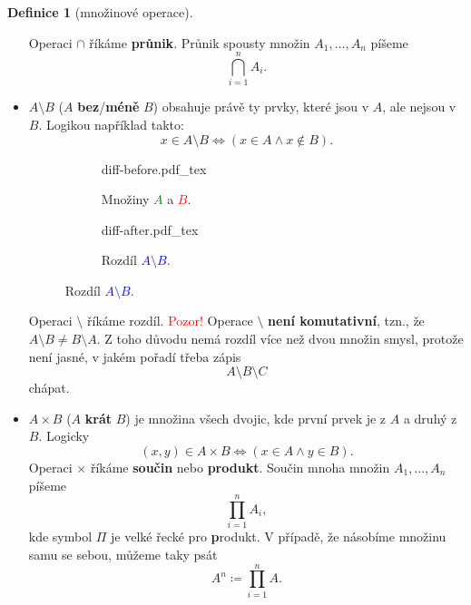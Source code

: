 \documentclass[a4paper,11pt]{article}
\theoremstyle{definition}
\newtheorem{dfn}[thm]{Definice}
\theoremstyle{plain}
\begin{document}
\begin{dfn}[množinové operace]
\begin{itemize}
\begin{center}
   \end{center}
   \vspace*{-8mm}
   Operaci $ \cap $ říkáme \textbf{průnik}. Průnik spousty množin
   $A_1,\ldots,A_n$ píšeme
   \[
    \bigcap_{i=1}^{n} A_i.
   \]
  \item $A \setminus B$ ($A$ \textbf{bez}/\textbf{méně} $B$) obsahuje právě ty
   prvky, které jsou v $A$, ale nejsou v $B$. Logikou například takto:
   \[
    x \in A \setminus B \Leftrightarrow (x \in A \wedge x \notin B).
   \]
   \begin{center}
    \begin{figure}[h]
     \centering
     \begin{subfigure}{0.45\textwidth}
      \centering
      \def\svgwidth{0.6\textwidth}
      {diff-before.pdf_tex}
      \caption*{Množiny \textcolor{green}{$A$} a \textcolor{red}{$B$}.}
     \end{subfigure}
     \begin{subfigure}{0.45\textwidth}
      \centering
      \def\svgwidth{0.6\textwidth}
      {diff-after.pdf_tex}
      \caption*{Rozdíl \textcolor{blue}{$A \setminus B$}.}
     \end{subfigure}
    \end{figure}
   \end{center}
   \vspace*{-8mm}
   Operaci $ \setminus $ říkáme rozdíl. \textcolor{red}{Pozor!} Operace $
   \setminus $ \textbf{není komutativní}, tzn., že $A \setminus B \neq B
   \setminus A$. Z toho důvodu nemá rozdíl více než dvou množin smysl, protože
   není jasné, v jakém pořadí třeba zápis
   \[
    A \setminus B \setminus C
   \]
   chápat.
  \item $A \times B$ ($A$ \textbf{krát} $B$) je množina všech dvojic, kde první
   prvek je z $A$ a druhý z $B$. Logicky
   \[
    (x,y) \in A \times B \Leftrightarrow (x \in A \wedge y \in B).
   \]
   Operaci $ \times $ říkáme \textbf{součin} nebo \textbf{produkt}. Součin mnoha
   množin $A_1,\ldots,A_n$ píšeme
   \[
    \prod_{i=1}^{n} A_i,
   \]
   kde symbol $\Pi$ je velké řecké  pro \textbf{p}rodukt. V případě, že
   násobíme množinu samu se sebou, můžeme taky psát
   \[
    A^{n} \coloneqq \prod_{i=1}^{n} A. 
   \]
 \end{itemize}
\end{dfn}
\end{document}
